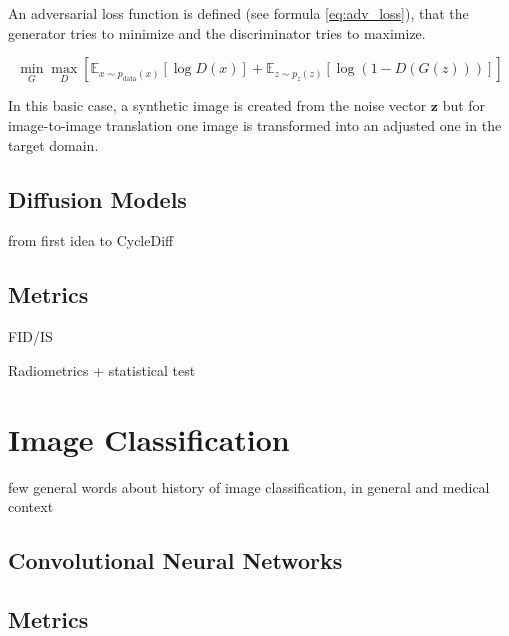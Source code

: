 An adversarial loss function is defined (see formula \ref{eq:adv_loss}), that the generator tries to minimize and the discriminator tries to maximize. 

\begin{equation}
    \min_G \max_D 
    [
    \mathbb{E}_{x \sim p_{\text{data}}(x)}[\log D(x)] +
    \mathbb{E}_{z \sim p_z(z)}[\log(1 - D(G(z)))]
    ]
    \label{eq:adv_loss}
\end{equation}

In this basic case, a synthetic image is created from the noise vector $\boldsymbol{z}$ but for image-to-image translation one image is transformed 
into an adjusted one in the target domain.



\subsection{Diffusion Models}

from first idea to CycleDiff

\subsection{Metrics}

FID/IS

Radiometrics + statistical test



\section{Image Classification}

few general words about history of image classification, in general and medical context

\subsection{Convolutional Neural Networks}

\subsection{Metrics}



